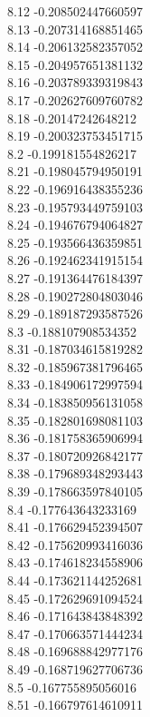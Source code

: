 {8.12	-0.208502447660597\\
8.13	-0.207314168851465\\
8.14	-0.206132582357052\\
8.15	-0.204957651381132\\
8.16	-0.203789339319843\\
8.17	-0.202627609760782\\
8.18	-0.20147242648212\\
8.19	-0.200323753451715\\
8.2	-0.199181554826217\\
8.21	-0.198045794950191\\
8.22	-0.196916438355236\\
8.23	-0.195793449759103\\
8.24	-0.194676794064827\\
8.25	-0.193566436359851\\
8.26	-0.192462341915154\\
8.27	-0.191364476184397\\
8.28	-0.190272804803046\\
8.29	-0.189187293587526\\
8.3	-0.188107908534352\\
8.31	-0.187034615819282\\
8.32	-0.185967381796465\\
8.33	-0.184906172997594\\
8.34	-0.183850956131058\\
8.35	-0.182801698081103\\
8.36	-0.181758365906994\\
8.37	-0.180720926842177\\
8.38	-0.179689348293443\\
8.39	-0.178663597840105\\
8.4	-0.177643643233169\\
8.41	-0.176629452394507\\
8.42	-0.175620993416036\\
8.43	-0.174618234558906\\
8.44	-0.173621144252681\\
8.45	-0.172629691094524\\
8.46	-0.171643843848392\\
8.47	-0.170663571444234\\
8.48	-0.169688842977176\\
8.49	-0.168719627706736\\
8.5	-0.167755895056016\\
8.51	-0.166797614610911\\
}
